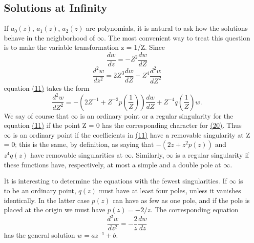 \setcounter{section}{4}\setcounter{subsection}{2}\subsection{Solutions at Infinity}\label{sec:8.4.3}
If $a_{0}(z)$, $a_{1}(z)$, $a_{2}(z)$ are polynomials, it is natural to ask how the solutions behave in the neighborhood of $\infty$. The most convenient way to treat this question is to make the variable transformation z = 1/Z. Since
\begin{equation*}
\frac {d w}{d z} = - Z ^ {2} \frac {d w}{d Z}
\end{equation*}
\begin{equation*}
\frac {d ^ {2} w}{d z ^ {2}} = 2 Z ^ {3} \frac {d w}{d Z} + Z ^ {4} \frac {d ^ {2} w}{d Z ^ {2}}
\end{equation*}
equation \hyperref[eq:8.11]{(11)} takes the form
\begin{equation*}
\frac {d ^ {2} w}{d Z ^ {2}} = - \left(2 Z ^ {- 1} + Z ^ {- 2} p \left(\frac {1}{Z}\right)\right) \frac {d w}{d Z} + Z ^ {- 4} q \left(\frac {1}{Z}\right) w.\tag{20}\label{eq:8.20}
\end{equation*}
We say of course that $\infty$ is an ordinary point or a regular singularity for the equation \hyperref[eq:8.11]{(11)} if the point Z = 0 has the corresponding character for \hyperref[eq:8.20]{(20)}. Thus $\infty$ is an ordinary point if the coefficients in \hyperref[eq:8.11]{(11)} have a removable singularity at Z = 0; this is the same, by definition, as saying that $-(2z + z^{2}p(z))$ and $z^{4}q(z)$ have removable singularities at $\infty$. Similarly, $\infty$ is a regular singularity if these functions have, respectively, at most a simple and a double pole at $\infty$.

It is interesting to determine the equations with the fewest singularities. If $\infty$ is to be an ordinary point, $q(z)$ must have at least four poles, unless it vanishes identically. In the latter case $p(z)$ can have as few as one pole, and if the pole is placed at the origin we must have $p(z) = -2/z$. The corresponding equation
\begin{equation*}
\frac {d ^ {2} w}{d z ^ {2}} = - \frac {2}{z} \frac {d w}{d z}
\end{equation*}
has the general solution $w = az^{-1} + b$.

